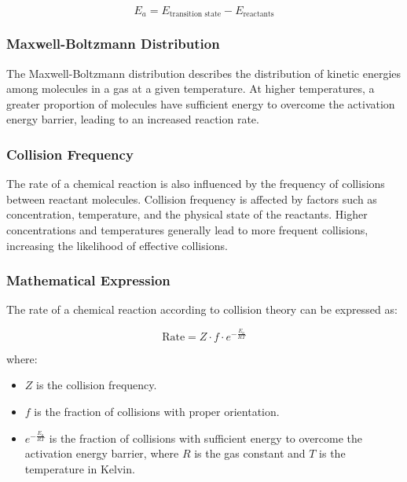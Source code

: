 \documentclass[10pt, roman]{article}
\begin{document}
\[
E_a = E_{\text{transition state}} - E_{\text{reactants}}
\]

\subsubsection{Maxwell-Boltzmann Distribution}

The Maxwell-Boltzmann distribution describes the distribution of kinetic energies among molecules in a gas at a given temperature. At higher temperatures, a greater proportion of molecules have sufficient energy to overcome the activation energy barrier, leading to an increased reaction rate.


\subsubsection{Collision Frequency}

The rate of a chemical reaction is also influenced by the frequency of collisions between reactant molecules. Collision frequency is affected by factors such as concentration, temperature, and the physical state of the reactants. Higher concentrations and temperatures generally lead to more frequent collisions, increasing the likelihood of effective collisions.

\subsubsection{Mathematical Expression}

The rate of a chemical reaction according to collision theory can be expressed as:

\[
\text{Rate} = Z \cdot f \cdot e^{-\frac{E_a}{RT}}
\]

where:
\begin{itemize}
    \item \(Z\) is the collision frequency.
    \item \(f\) is the fraction of collisions with proper orientation.
    \item \(e^{-\frac{E_a}{RT}}\) is the fraction of collisions with sufficient energy to overcome the activation energy barrier, where \(R\) is the gas constant and \(T\) is the temperature in Kelvin.
\end{itemize}
\end{document}
